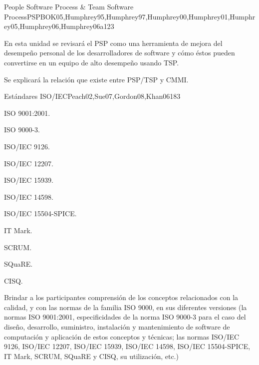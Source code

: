 \begin{syllabus}
\begin{unit}{People Software Process \& Team Software Process}{PSPBOK05,Humphrey95,Humphrey97,Humphrey00,Humphrey01,Humphrey05,Humphrey06,Humphrey06a}{12}{3}
   \begin{unitgoals}
      \item En esta unidad se revisará el PSP como una herramienta de mejora del desempeño personal de los desarrolladores de software y cómo éstos pueden convertirse en un equipo de alto desempeño usando TSP.
      \item Se explicará la relación que existe entre PSP/TSP y CMMI.
   \end{unitgoals}
\end{unit}

\begin{unit}{Estándares ISO/IEC}{Peach02,Sue07,Gordon08,Khan06}{18}{3}
   \begin{topics}
      \item ISO 9001:2001.
      \item ISO 9000-3.
      \item ISO/IEC 9126.
      \item ISO/IEC 12207.
      \item ISO/IEC 15939.
      \item ISO/IEC 14598.
      \item ISO/IEC 15504-SPICE.
      \item IT Mark.
      \item SCRUM.
      \item SQuaRE.
      \item CISQ.
   \end{topics}

   \begin{unitgoals}
      \item Brindar a los participantes comprensión de los conceptos relacionados con la calidad, y con las normas de la familia ISO 9000, en sus diferentes versiones (la normas ISO 9001:2001, especificidades de la norma ISO 9000-3 para el caso del diseño, desarrollo, suministro, instalación y mantenimiento de software de computación y aplicación de estos conceptos y técnicas; las normas ISO/IEC 9126, ISO/IEC 12207, ISO/IEC 15939, ISO/IEC 14598, ISO/IEC 15504-SPICE, IT Mark, SCRUM, SQuaRE y CISQ, su utilización, etc.)
   \end{unitgoals}
\end{unit}


\end{syllabus}
